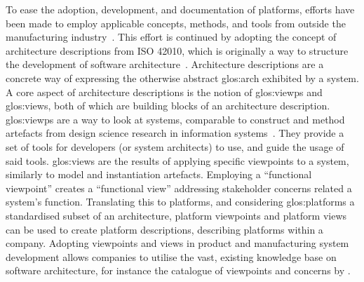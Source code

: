 To ease the adoption, development, and documentation of platforms, efforts have been made to employ applicable concepts, methods, and tools from outside the manufacturing industry~\parencite{JepsenPhD,BENKAMOUN201488,BossenCMod}.
This effort is continued by adopting the concept of architecture descriptions from ISO 42010, which is originally a way to structure the development of software architecture~\parencite{ISO42010}.
Architecture descriptions are a concrete way of expressing the otherwise abstract \gls{glos:arch} exhibited by a system.
A core aspect of architecture descriptions is the notion of \gls{glos:viewp}s and \gls{glos:view}s, both of which are building blocks of an architecture description.
\Gls{glos:viewp}s are a way to look at systems, comparable to construct and method artefacts from design science research in information systems~\parencite{Hevner2010}.
They provide a set of tools for developers (or system architects) to use, and guide the usage of said tools.
\Gls{glos:view}s are the results of applying specific viewpoints to a system, similarly to model and instantiation artefacts.
Employing a ``functional viewpoint'' creates a ``functional view'' addressing stakeholder concerns related a system's function.
Translating this to platforms, and considering \gls{glos:platform}s a standardised subset of an architecture, platform viewpoints and platform views can be used to create platform descriptions, describing platforms within a company.
Adopting viewpoints and views in product and manufacturing system development allows companies to utilise the vast, existing knowledge base on software architecture, for instance the catalogue of viewpoints and concerns by \textcite{RozanskiSSA}.

